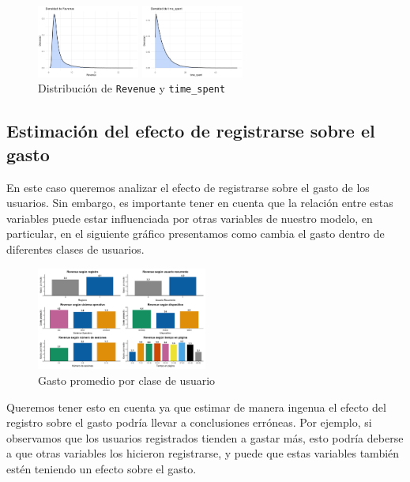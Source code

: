 \documentclass[conference]{IEEEtran}
\begin{document}
\begin{figure}[H]
    \centering
    \includegraphics[width=0.3\textwidth]{figures/revenueA.png}

    \includegraphics[width=0.3\textwidth]{figures/timespentA.png}
    \caption{Distribución de \texttt{Revenue} y \texttt{time\_spent}}
    \label{fig:distribucion}
\end{figure}



\subsection{Estimación del efecto de registrarse sobre el gasto}

En este caso queremos analizar el efecto de registrarse sobre el gasto de los usuarios. 
Sin embargo, es importante tener en cuenta que la relación entre estas variables puede estar influenciada por otras variables de nuestro modelo, 
en particular, en el siguiente gráfico presentamos como cambia el gasto dentro de diferentes clases de usuarios.

\begin{figure}[H]
    \centering
    \includegraphics[width=0.5\textwidth]{figures/GastoA.png}
    \caption{Gasto promedio por clase de usuario}
    \label{fig:coefplot}
\end{figure}

Queremos tener esto en cuenta ya que estimar de manera ingenua el efecto del registro sobre el gasto podría llevar a conclusiones erróneas.
Por ejemplo, si observamos que los usuarios registrados tienden a gastar más, esto podría deberse a que otras variables los hicieron registrarse, y puede que estas variables también
estén teniendo un efecto sobre el gasto.
\end{document}
